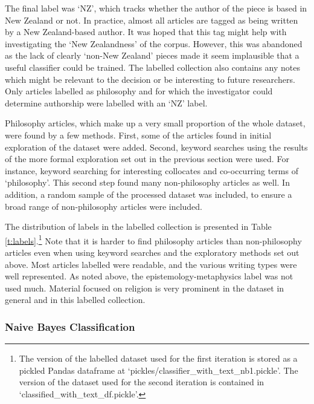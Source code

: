 \documentclass{article}
\begin{document}
The final label was `NZ', which tracks whether the author of the piece is based in New Zealand or not. In practice, almost all articles are tagged as being written by a New Zealand-based author. It was hoped that this tag might help with investigating the `New Zealandness' of the corpus. However, this was abandoned as the lack of clearly `non-New Zealand' pieces made it seem implausible that a useful classifier could be trained. The labelled collection also contains any notes which might be relevant to the decision or be interesting to future researchers. Only articles labelled as philosophy and for which the investigator could determine authorship were labelled with an `NZ' label.

Philosophy articles, which make up a very small proportion of the whole dataset, were found by a few methods. First, some of the articles found in initial exploration of the dataset were added. Second, keyword searches using the results of the more formal exploration set out in the previous section were used. For instance, keyword searching for interesting collocates and co-occurring terms of `philosophy'. This second step found many non-philosophy articles as well. In addition, a random sample of the processed dataset was included, to ensure a broad range of non-philosophy articles were included.

The distribution of labels in the labelled collection is presented in Table \ref{t:labels}.\footnote{The version of the labelled dataset used for the first iteration is stored as a pickled Pandas dataframe at `pickles/classifier\_\-with\_\-text\_\-nb1.pickle'. The version of the dataset used for the second iteration is contained in `classified\_\-with\_\-text\_\-df.pickle'.} Note that it is harder to find philosophy articles than non-philosophy articles even when using keyword searches and the exploratory methods set out above. Most articles labelled were readable, and the various writing types were well represented. As noted above, the epistemology-metaphysics label was not used much. Material focused on religion is very prominent in the dataset in general and in this labelled collection.

\subsubsection{Naive Bayes Classification}\label{s:nbc}
\end{document}
